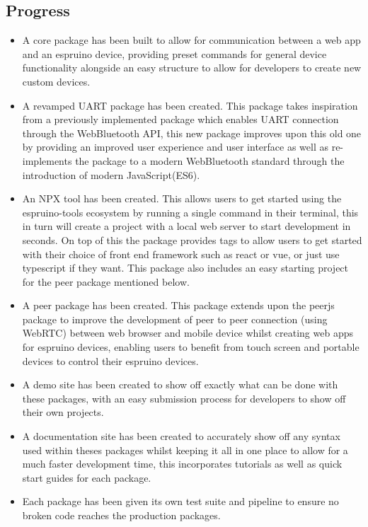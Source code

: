 \documentclass[11pt]{article}
\begin{document}
\subsection{Progress}\label{progress}



\begin{itemize}
    \item A core package has been built to allow for communication between a web app and an espruino device, providing preset commands for general device functionality alongside an easy structure to allow for developers to create new custom devices.
    \item A revamped UART package has been created. This package takes inspiration from a previously implemented package which enables UART connection through the WebBluetooth API, this new package improves upon this old one by providing an improved user experience and user interface as well as re-implements the package to a modern WebBluetooth standard through the introduction of modern JavaScript(ES6).
    \item An NPX tool has been created. This allows users to get started using the espruino-tools ecosystem by running a single command in their terminal, this in turn will create a project with a local web server to start development in seconds. On top of this the package provides tags to allow users to get started with their choice of front end framework such as react or vue, or just use typescript if they want. This package also includes an easy starting project for the peer package mentioned below.
    \item A peer package has been created. This package extends upon the peerjs package to improve the development of peer to peer connection (using WebRTC) between web browser and mobile device whilst creating web apps for espruino devices, enabling users to benefit from touch screen and portable devices to control their espruino devices.
    \item A demo site has been created to show off exactly what can be done with these packages, with an easy submission process for developers to show off their own projects.
    \item A documentation site has been created to accurately show off any syntax used within theses packages whilst keeping it all in one place to allow for a much faster development time, this incorporates tutorials as well as quick start guides for each package.
    \item Each package has been given its own test suite and pipeline to ensure no broken code reaches the production packages.
\end{itemize}
\end{document}
